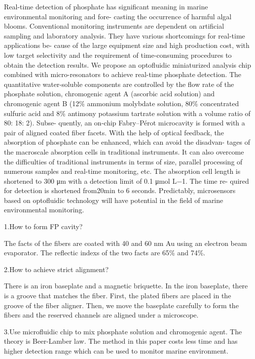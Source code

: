 \documentclass{article}
\begin{document}
Real-time detection of phosphate has significant meaning in marine environmental monitoring and fore- casting the occurrence of harmful algal blooms. Conventional monitoring instruments are dependent on artificial sampling and laboratory analysis. They have various shortcomings for real-time applications be- cause of the large equipment size and high production cost, with low target selectivity and the requirement of time-consuming procedures to obtain the detection results. We propose an optofluidic miniaturized analysis chip combined with micro-resonators to achieve real-time phosphate detection. The quantitative water-soluble components are controlled by the flow rate of the phosphate solution, chromogenic agent A (ascorbic acid solution) and chromogenic agent B (12\% ammonium molybdate solution, 80\% concentrated sulfuric acid and 8\% antimony potassium tartrate solution with a volume ratio of 80: 18: 2). Subse- quently, an on-chip Fabry–Pérot microcavity is formed with a pair of aligned coated fiber facets. With the help of optical feedback, the absorption of phosphate can be enhanced, which can avoid the disadvan- tages of the macroscale absorption cells in traditional instruments. It can also overcome the difficulties of traditional instruments in terms of size, parallel processing of numerous samples and real-time monitoring, etc. The absorption cell length is shortened to 300 μm with a detection limit of 0.1 μmol L−1. The time re- quired for detection is shortened from20min to 6 seconds. Predictably, microsensors based on optofluidic technology will have potential in the field of marine environmental monitoring.


1.How to form FP cavity?

The facts of the fibers are coated with 40 and 60 nm Au using an electron beam evaporator. The reflectic indexs of the two facts are 65\% and 74\%.


2.How to achieve strict alignment?

There is an iron baseplate and a magnetic briquette. In the iron baseplate, there is a groove that matches the fiber. First, the plated fibers are placed in the groove of the fiber aligner. Then, we move the baseplate carefully to form the fibers and the reserved channels are aligned under a microscope.


3.Use microfluidic chip to mix phosphate solution and chromogenic agent. The theory is Beer-Lamber law. The method in this paper costs less time and has higher detection range which can be used to monitor marine environment.
\end{document}

